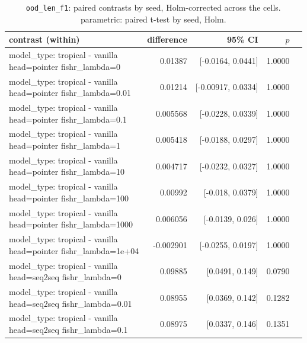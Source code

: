 \documentclass[10pt]{article}
\makeatletter
\newcommand{\stackcell}[1]{\begin{tabular}[t]{@{}l@{}}#1\end{tabular}}
\makeatother
\begin{document}
{\small
\begin{longtable}{lrrrl}
\caption{\texttt{ood\_len\_f1}: paired contrasts by seed, Holm-corrected across the cells. parametric: paired t-test by seed, Holm.}\label{tab:paired-ood_len_f1}\\
\toprule
contrast (within) & difference & 95\% CI & $p$ & \\
\midrule
\endhead
\stackcell{model\_type: tropical - vanilla\\\footnotesize head=pointer fishr\_lambda=0 } & 0.01387 & [-0.0164, 0.0441] & 1.0000 & \\
\stackcell{model\_type: tropical - vanilla\\\footnotesize head=pointer fishr\_lambda=0.01 } & 0.01214 & [-0.00917, 0.0334] & 1.0000 & \\
\stackcell{model\_type: tropical - vanilla\\\footnotesize head=pointer fishr\_lambda=0.1 } & 0.005568 & [-0.0228, 0.0339] & 1.0000 & \\
\stackcell{model\_type: tropical - vanilla\\\footnotesize head=pointer fishr\_lambda=1 } & 0.005418 & [-0.0188, 0.0297] & 1.0000 & \\
\stackcell{model\_type: tropical - vanilla\\\footnotesize head=pointer fishr\_lambda=10 } & 0.004717 & [-0.0232, 0.0327] & 1.0000 & \\
\stackcell{model\_type: tropical - vanilla\\\footnotesize head=pointer fishr\_lambda=100 } & 0.00992 & [-0.018, 0.0379] & 1.0000 & \\
\stackcell{model\_type: tropical - vanilla\\\footnotesize head=pointer fishr\_lambda=1000 } & 0.006056 & [-0.0139, 0.026] & 1.0000 & \\
\stackcell{model\_type: tropical - vanilla\\\footnotesize head=pointer fishr\_lambda=1e+04 } & -0.002901 & [-0.0255, 0.0197] & 1.0000 & \\
\stackcell{model\_type: tropical - vanilla\\\footnotesize head=seq2seq fishr\_lambda=0 } & 0.09885 & [0.0491, 0.149] & 0.0790 & \\
\stackcell{model\_type: tropical - vanilla\\\footnotesize head=seq2seq fishr\_lambda=0.01 } & 0.08955 & [0.0369, 0.142] & 0.1282 & \\
\stackcell{model\_type: tropical - vanilla\\\footnotesize head=seq2seq fishr\_lambda=0.1 } & 0.08975 & [0.0337, 0.146] & 0.1351 & \\

\end{longtable}}
\end{document}
